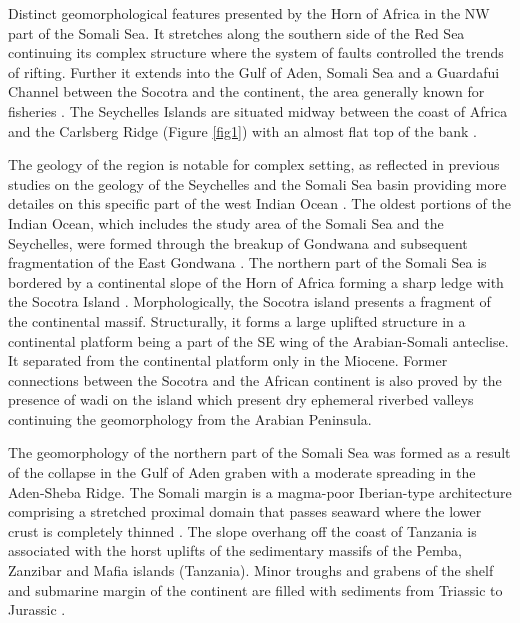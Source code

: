 \documentclass[]{interact}
\begin{document}
Distinct geomorphological features presented by the Horn of Africa \cite{Cashionetal2018} in the NW part of the Somali Sea. It stretches along the southern side of the Red Sea continuing its complex structure \cite{DaviesTramontini} where the system of faults controlled the trends of rifting. Further it extends into the Gulf of Aden, Somali Sea and a Guardafui Channel between the Socotra and the continent, the area generally known for fisheries \cite{SumailaBawumia}. The Seychelles Islands are situated midway between the coast of Africa and the Carlsberg Ridge (Figure \ref{fig1}) with an almost flat top of the bank \cite{MatthewsDavies}.

The geology of the region is notable for complex setting, as reflected in previous studies on the geology of the Seychelles and the Somali Sea basin providing more detailes on this specific part of the west Indian Ocean \cite{KroenerSassi,Davisetal2016,Fantozzi,Koningetal1997,Lerouxetal2020}. The oldest portions of the Indian Ocean, which includes the study area of the Somali Sea and the Seychelles, were formed through the breakup of Gondwana and subsequent fragmentation of the East Gondwana \cite{Davisetal2016}. The northern part of the Somali Sea is bordered by a continental slope of the Horn of Africa forming a sharp ledge with the Socotra Island \cite{Boehnecke}. Morphologically, the Socotra island presents a fragment of the continental massif. Structurally, it forms a large uplifted structure in a continental platform being a part of the SE wing of the Arabian-Somali anteclise. It separated from the continental platform only in the Miocene. Former connections between the Socotra and the African continent is also proved by the presence of wadi on the island which present dry ephemeral riverbed valleys continuing the geomorphology from the Arabian Peninsula. 

The geomorphology of the northern part of the Somali Sea was formed as a result of the collapse in the Gulf of Aden graben with a moderate spreading in the Aden-Sheba Ridge. The Somali margin is a magma-poor Iberian-type architecture comprising a stretched proximal domain that passes seaward where the lower crust is completely thinned \cite{Mortimeretal2020}. The slope overhang off the coast of Tanzania is associated with the horst uplifts of the sedimentary massifs of the Pemba, Zanzibar and Mafia islands (Tanzania). Minor troughs and grabens of the shelf and submarine margin of the continent are filled with sediments from Triassic to Jurassic \cite{McKenzieSclater1971,McKenzieSclater1973}.
\end{document}
